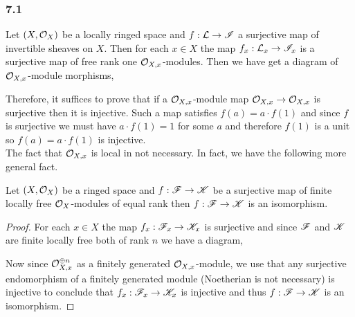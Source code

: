 \documentclass[12pt]{article}
\begin{document}
\subsubsection{7.1}

Let $(X, \mathcal{O}_{X})$ be a locally ringed space and $f : \mathcal{L} \to \mathscr{I}$ a surjective map of invertible sheaves on $X$. Then for each $x \in X$ the map $f_x : \mathcal{L}_x \to \mathscr{I}_x$ is a surjective map of free rank one $\mathcal{O}_{X, x}$-modules. Then we have get a diagram of $\mathcal{O}_{X, x}$-module morphisms,
\begin{center}
\end{center}
Therefore, it suffices to prove that if a $\mathcal{O}_{X, x}$-module map $\mathcal{O}_{X, x} \to \mathcal{O}_{X, x}$ is surjective then it is injective. Such a map satisfies $f(a) = a \cdot f(1)$ and since $f$ is surjective we must have $a \cdot f(1) = 1$ for some $a$ and therefore $f(1)$ is a unit so $f(a) = a \cdot f(1)$ is injective.
\bigskip\\
The fact that $\mathcal{O}_{X, x}$ is local in not necessary. In fact, we have the following more general fact.

\begin{theorem}
Let $(X, \mathcal{O}_{X})$ be a ringed space and $f : \mathscr{F} \to \mathscr{K}$ be a surjective map of finite locally free $\mathcal{O}_{X}$-modules of equal rank then $f : \mathscr{F} \to \mathscr{K}$ is an isomorphism. 
\end{theorem}

\begin{proof}
For each $x \in X$ the map $f_x : \mathscr{F}_x \to \mathscr{K}_x$ is surjective and since $\mathscr{F}$ and $\mathscr{K}$ are finite locally free both of rank $n$ we have a diagram,
\begin{center}
\end{center}
Now since $\mathcal{O}_{X, x}^{\oplus n}$ as a finitely generated $\mathcal{O}_{X, x}$-module,  we use that any surjective endomorphism of a finitely generated module (Noetherian is not necessary) is injective to conclude that $f_x : \mathscr{F}_x \to \mathscr{K}_x$ is injective and thus $f : \mathscr{F} \to \mathscr{K}$ is an isomorphism. 
\end{proof}
\end{document}
